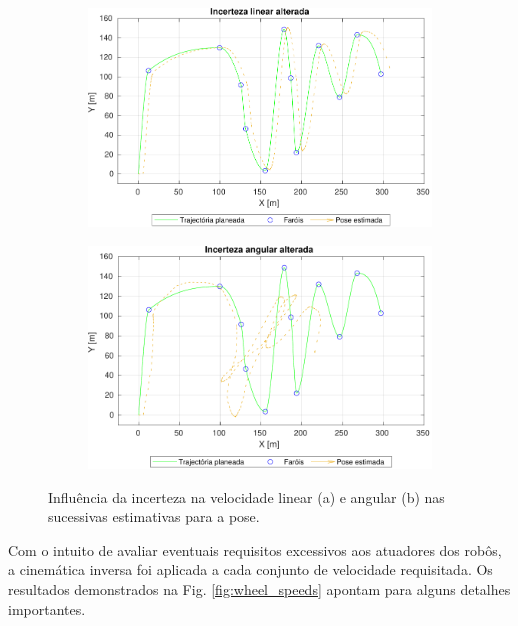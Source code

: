 \documentclass{article}
\begin{document}
\begin{figure}[ht]
     \centering
     \begin{subfigure}[b]{0.49\textwidth}
         \centering
         \includegraphics[width=\textwidth]{figs/ekf_vn0.1.pdf}
         \caption{}
         \label{fig:ekf_vn0.1}
     \end{subfigure}
     \hfill
     \begin{subfigure}[b]{0.49\textwidth}
         \centering
         \includegraphics[width=\textwidth]{figs/ekf_wn0.1.pdf}
         \caption{}
         \label{fig:ekf_wn0.1}
     \end{subfigure}
     \caption{Influência da incerteza na velocidade linear (a) e angular (b) nas sucessivas estimativas para a pose.}
     \label{fig:ekf_uncertainty}
\end{figure}

Com o intuito de avaliar eventuais requisitos excessivos aos atuadores dos robôs, a cinemática inversa foi aplicada a cada conjunto de velocidade requisitada. Os resultados demonstrados na Fig. \ref{fig:wheel_speeds} apontam para alguns detalhes importantes.
\end{document}
